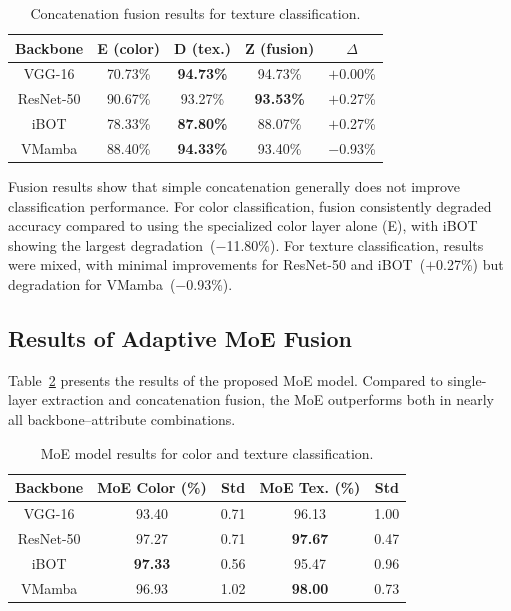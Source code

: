 \documentclass[conference]{IEEEtran}
\begin{document}
\begin{table}[htbp]
\caption{Concatenation fusion results for texture classification.}
\begin{center}
\begin{tabular}{c|c|c|c|c}
\hline
\textbf{Backbone} & \textbf{E (color)} & \textbf{D (tex.)}
                  & \textbf{Z (fusion)} & \textbf{$\Delta$} \\
\hline
VGG-16    & 70.73\% & \textbf{94.73\%} & 94.73\% & $+$0.00\% \\
ResNet-50 & 90.67\% & 93.27\%          & \textbf{93.53\%} & $+$0.27\% \\
iBOT      & 78.33\% & \textbf{87.80\%} & 88.07\% & $+$0.27\% \\
VMamba    & 88.40\% & \textbf{94.33\%} & 93.40\% & $-$0.93\% \\
\hline
\end{tabular}
\label{tab7}
\end{center}
\end{table}

Fusion results show that simple concatenation generally does not improve
classification performance.
For color classification, fusion consistently degraded accuracy compared
to using the specialized color layer alone (E), with iBOT showing the
largest degradation~($-$11.80\%).
For texture classification, results were mixed, with minimal improvements
for ResNet-50 and iBOT~($+$0.27\%) but degradation for VMamba~($-$0.93\%).

\subsection{Results of Adaptive MoE Fusion}

Table~\ref{tab_moe} presents the results of the proposed MoE model.
Compared to single-layer extraction and concatenation fusion, the MoE
outperforms both in nearly all backbone–attribute combinations.

\begin{table}[htbp]
\caption{MoE model results for color and texture classification.}
\begin{center}
\begin{tabular}{c|c|c|c|c}
\hline
\textbf{Backbone} & \textbf{MoE Color (\%)} & \textbf{Std}
                  & \textbf{MoE Tex. (\%)} & \textbf{Std} \\
\hline
VGG-16    & 93.40 & 0.71 & 96.13 & 1.00 \\
ResNet-50 & 97.27 & 0.71 & \textbf{97.67} & 0.47 \\
iBOT      & \textbf{97.33} & 0.56 & 95.47 & 0.96 \\
VMamba    & 96.93 & 1.02 & \textbf{98.00} & 0.73 \\
\hline
\end{tabular}
\label{tab_moe}
\end{center}
\end{table}
\end{document}
